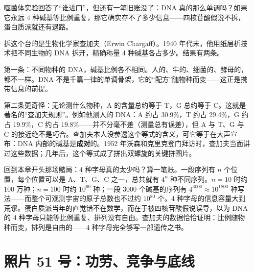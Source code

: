 噬菌体实验回答了“谁进门”，但还有一笔旧账没了：DNA 真的那么单调吗？如果它永远 4 种碱基等比例重复，那它确实存不了多少信息——四核苷酸假说不拆，蛋白质派就还有退路。

拆这个台的是生物化学家查加夫（Erwin Chargaff）。1940 年代末，他用纸层析技术把不同生物的 DNA 拆开，精确称量 4 种碱基各占多少。结果有两条。

第一条：不同物种的 DNA，碱基比例各不相同。人的、牛的、细菌的、酵母的，都不一样。DNA 不是千篇一律的单调骨架，它的“配方”随物种而变——这正是携带信息的前提。

第二条更奇怪：无论测什么物种，A 的含量总约等于 T，G 总约等于 C。这就是著名的“查加夫规则”。例如他测人的 DNA：A 约占 30.9\%，T 约占 29.4\%，G 约占 19.9\%，C 约占 19.8\%——并不分毫不差（测量总有误差），但 A 与 T、G 与 C 的接近绝不是巧合。查加夫本人没参透这个等式的含义，可它等于在大声宣布：DNA 内部的碱基是\textbf{成对}的。1952 年沃森和克里克登门拜访时，查加夫当面讲过这些数据；几年后，这个等式成了拼出双螺旋的关键拼图片。

\begin{qiaoliang}
回到本章开头那场赌局：4 种字母真的太少吗？算一笔账。一段序列有 $n$ 个位置，每个位置可以是 A、T、G、C 之一，总共就有 $4^n$ 种不同序列。$n=10$ 时约 100 万种；$n=100$ 时约 $10^{60}$ 种；一段 3000 个碱基的序列有 $4^{3000}\approx 10^{1800}$ 种写法——而整个可观测宇宙的原子总数也不过约 $10^{80}$ 个。4 种字母的信息容量大到荒谬。蛋白质派当年的直觉错不在数学，而在于被四核苷酸假说误导，以为 DNA 的 4 种字母只能等比例重复、排列没有自由。查加夫的数据恰恰证明：比例随物种而变，排列是自由的——4 种字母完全够写一部遗传之书。
\end{qiaoliang}

\section{照片 51 号：功劳、竞争与底线}


